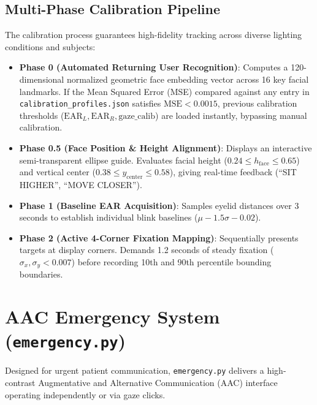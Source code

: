 \documentclass[11pt,a4paper]{article}
\begin{document}
\subsection{Multi-Phase Calibration Pipeline}
The calibration process guarantees high-fidelity tracking across diverse lighting conditions and subjects:
\begin{itemize}
    \item \textbf{Phase 0 (Automated Returning User Recognition)}: Computes a 120-dimensional normalized geometric face embedding vector across 16 key facial landmarks. If the Mean Squared Error (MSE) compared against any entry in \texttt{calibration\_profiles.json} satisfies $\text{MSE} < 0.0015$, previous calibration thresholds ($\text{EAR}_L, \text{EAR}_R, \text{gaze\_calib}$) are loaded instantly, bypassing manual calibration.
    \item \textbf{Phase 0.5 (Face Position \& Height Alignment)}: Displays an interactive semi-transparent ellipse guide. Evaluates facial height ($0.24 \le h_{\text{face}} \le 0.65$) and vertical center ($0.38 \le y_{\text{center}} \le 0.58$), giving real-time feedback (``SIT HIGHER'', ``MOVE CLOSER'').
    \item \textbf{Phase 1 (Baseline EAR Acquisition)}: Samples eyelid distances over 3 seconds to establish individual blink baselines ($\mu - 1.5\sigma - 0.02$).
    \item \textbf{Phase 2 (Active 4-Corner Fixation Mapping)}: Sequentially presents targets at display corners. Demands 1.2 seconds of steady fixation ($\sigma_x, \sigma_y < 0.007$) before recording 10th and 90th percentile bounding boundaries.
\end{itemize}

\section{AAC Emergency System (\texttt{emergency.py})}

Designed for urgent patient communication, \texttt{emergency.py} delivers a high-contrast Augmentative and Alternative Communication (AAC) interface operating independently or via gaze clicks.
\end{document}
